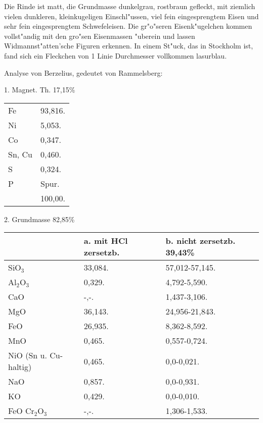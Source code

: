\documentclass[a4paper, 11pt, oneside]{article}
\begin{document}
Die Rinde ist matt, die Grundmasse dunkelgrau, rostbraun gefleckt, mit ziemlich vielen dunkleren, kleinkugeligen Einschl"ussen, viel fein eingesprengtem Eisen und sehr fein eingesprengtem Schwefeleisen. Die gr"o"seren Eisenk"ugelchen kommen vollst"andig mit den gro"sen Eisenmassen "uberein und lassen Widmannst"atten'sche Figuren erkennen. In einem St"uck, das in Stockholm ist, fand sich ein Fleckchen von 1 Linie Durchmesser vollkommen lasurblau.

Analyse von Berzelius, gedeutet von Rammelsberg:
\begin{center}
1. Magnet. Th. 17,15\%
\end{center}
\begin{table}[H]
    \centering
    \begin{tabular}{l l}
        Fe & 93,816. \\
        Ni & 5,053. \\
        Co & 0,347. \\
        Sn, Cu & 0,460. \\
        S & 0,324. \\
        P & Spur. \\
         & 100,00. \\
    \end{tabular}
\end{table}
\begin{center}
2. Grundmasse 82,85\%
\end{center}
\begin{table}[H]
    \centering
    \begin{tabular}{l l l}
         & a. mit HCl zersetzb.  & b. nicht zersetzb. 39,43\%  \\ \hline
        SiO$_{3}$ & 33,084. & 57,012-57,145. \\
        Al$_{2}$O$_{3}$ & 0,329. & 4,792-5,590. \\
        CaO & -,-. & 1,437-3,106. \\
        MgO & 36,143. & 24,956-21,843. \\
        FeO & 26,935. & 8,362-8,592. \\
        MnO & 0,465. & 0,557-0,724. \\
        NiO (Sn u. Cu-haltig)  & 0,465. & 0,0-0,021. \\
        NaO & 0,857. & 0,0-0,931. \\
        KO & 0,429. & 0,0-0,010. \\
        FeO Cr$_{2}$O$_{3}$ & -,-. & 1,306-1,533. \\
    \end{tabular}
\end{table}
\end{document}
